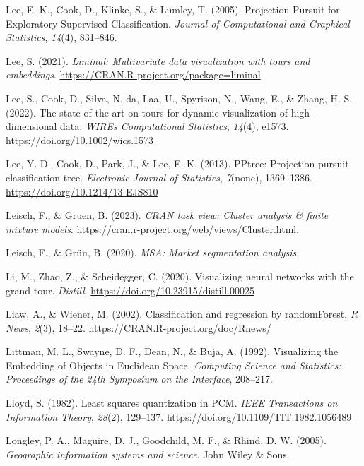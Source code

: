 \documentclass[
  letterpaper,
]{krantz}
\newlength{\cslhangindent}
\newenvironment{CSLReferences}[2] %
 {\begin{list}{}{%
  \setlength{\itemindent}{0pt}
  \setlength{\leftmargin}{0pt}
  \setlength{\parsep}{0pt}
  \ifodd #1
   \setlength{\leftmargin}{\cslhangindent}
   \setlength{\itemindent}{-1\cslhangindent}
  \fi
  \setlength{\itemsep}{#2\baselineskip}}}
 {\end{list}}
\begin{document}
\begin{CSLReferences}{1}{0}
Lee, E.-K., Cook, D., Klinke, S., \& Lumley, T. (2005). {P}rojection
{P}ursuit for {E}xploratory {S}upervised {C}lassification. \emph{Journal
of Computational and Graphical Statistics}, \emph{14}(4), 831--846.

Lee, S. (2021). \emph{Liminal: Multivariate data visualization with
tours and embeddings}. \url{https://CRAN.R-project.org/package=liminal}

Lee, S., Cook, D., Silva, N. da, Laa, U., Spyrison, N., Wang, E., \&
Zhang, H. S. (2022). The state-of-the-art on tours for dynamic
visualization of high-dimensional data. \emph{WIREs Computational
Statistics}, \emph{14}(4), e1573.
\url{https://doi.org/10.1002/wics.1573}

Lee, Y. D., Cook, D., Park, J., \& Lee, E.-K. (2013). {PPtree:
Projection pursuit classification tree}. \emph{Electronic Journal of
Statistics}, \emph{7}(none), 1369--1386.
\url{https://doi.org/10.1214/13-EJS810}

Leisch, F., \& Gruen, B. (2023). \emph{CRAN task view: Cluster analysis
\& finite mixture models}.
https://cran.r-project.org/web/views/Cluster.html.

Leisch, F., \& Grün, B. (2020). \emph{MSA: Market segmentation
analysis}.

Li, M., Zhao, Z., \& Scheidegger, C. (2020). Visualizing neural networks
with the grand tour. \emph{Distill}.
\url{https://doi.org/10.23915/distill.00025}

Liaw, A., \& Wiener, M. (2002). Classification and regression by
randomForest. \emph{R News}, \emph{2}(3), 18--22.
\url{https://CRAN.R-project.org/doc/Rnews/}

Littman, M. L., Swayne, D. F., Dean, N., \& Buja, A. (1992). Visualizing
the {E}mbedding of {O}bjects in {E}uclidean {S}pace. \emph{Computing
Science and Statistics: Proceedings of the 24th Symposium on the
Interface}, 208--217.

Lloyd, S. (1982). Least squares quantization in PCM. \emph{IEEE
Transactions on Information Theory}, \emph{28}(2), 129--137.
\url{https://doi.org/10.1109/TIT.1982.1056489}

Longley, P. A., Maguire, D. J., Goodchild, M. F., \& Rhind, D. W.
(2005). \emph{Geographic information systems and science}. John Wiley \&
Sons.


\end{CSLReferences}
\end{document}
